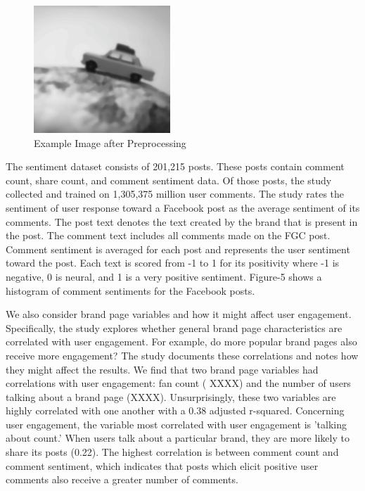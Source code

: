 \documentclass[mksc,blindrev]{informs3} %
\begin{document}
\begin{figure}
\centering
\includegraphics[width=\columnwidth]{images/preprocessed_image.png}
\caption{Example Image after Preprocessing}
\label{processed_image}
\end{figure}

The sentiment dataset consists of 201,215 posts. These posts contain comment count, share count, and comment sentiment data. Of those posts, the study collected and trained on 1,305,375 million user comments.  The study rates the sentiment of user response toward a Facebook post as the average sentiment of its comments. The post text denotes the text created by the brand that is present in the post. The comment text includes all  comments made on the FGC post. Comment sentiment is averaged for each post and represents the user sentiment toward the post. Each text is scored from -1 to 1 for its positivity where -1 is negative, 0 is neural, and 1 is a very positive sentiment. Figure-5 shows a histogram of comment sentiments for the Facebook posts. 

We also consider brand page variables and how it might affect user engagement. Specifically, the study explores whether general brand page characteristics are correlated with user engagement. For example, do more popular brand pages also receive more engagement? The study documents these correlations and notes how they might affect the results. We find that two brand page variables had correlations with user engagement: fan count ( XXXX) and the number of users talking about a brand page (XXXX). Unsurprisingly, these two variables are highly correlated with one another with a 0.38 adjusted r-squared. Concerning user engagement, the variable most correlated with user engagement is ’talking about count.’ When users talk about a particular brand, they are more likely to share its posts (0.22). The highest correlation is between comment count and comment sentiment, which indicates that posts which elicit positive user comments also receive a greater number of comments. 
\end{document}
